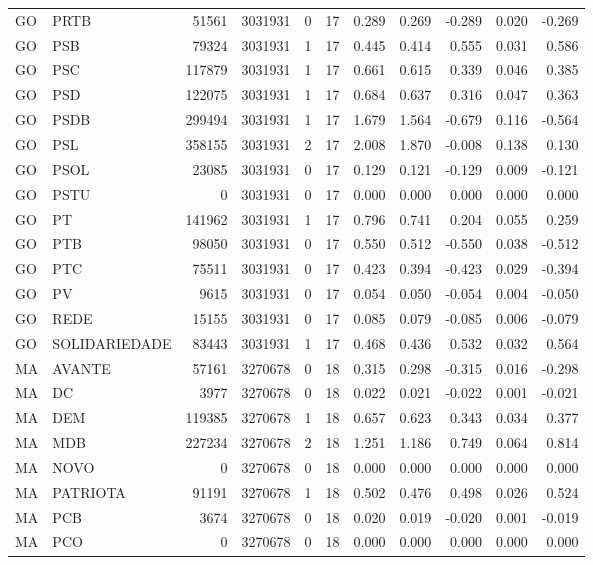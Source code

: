 \begin{landscape}
\begin{longtable}{llrrrrrrrrr}
GO & PRTB & 51561 & 3031931 & 0 & 17 & 0.289 & 0.269 & -0.289 & 0.020 & -0.269 \\
GO & PSB & 79324 & 3031931 & 1 & 17 & 0.445 & 0.414 & 0.555 & 0.031 & 0.586 \\
GO & PSC & 117879 & 3031931 & 1 & 17 & 0.661 & 0.615 & 0.339 & 0.046 & 0.385 \\
GO & PSD & 122075 & 3031931 & 1 & 17 & 0.684 & 0.637 & 0.316 & 0.047 & 0.363 \\
GO & PSDB & 299494 & 3031931 & 1 & 17 & 1.679 & 1.564 & -0.679 & 0.116 & -0.564 \\
GO & PSL & 358155 & 3031931 & 2 & 17 & 2.008 & 1.870 & -0.008 & 0.138 & 0.130 \\
GO & PSOL & 23085 & 3031931 & 0 & 17 & 0.129 & 0.121 & -0.129 & 0.009 & -0.121 \\
GO & PSTU & 0 & 3031931 & 0 & 17 & 0.000 & 0.000 & 0.000 & 0.000 & 0.000 \\
GO & PT & 141962 & 3031931 & 1 & 17 & 0.796 & 0.741 & 0.204 & 0.055 & 0.259 \\
GO & PTB & 98050 & 3031931 & 0 & 17 & 0.550 & 0.512 & -0.550 & 0.038 & -0.512 \\
GO & PTC & 75511 & 3031931 & 0 & 17 & 0.423 & 0.394 & -0.423 & 0.029 & -0.394 \\
GO & PV & 9615 & 3031931 & 0 & 17 & 0.054 & 0.050 & -0.054 & 0.004 & -0.050 \\
GO & REDE & 15155 & 3031931 & 0 & 17 & 0.085 & 0.079 & -0.085 & 0.006 & -0.079 \\
GO & SOLIDARIEDADE & 83443 & 3031931 & 1 & 17 & 0.468 & 0.436 & 0.532 & 0.032 & 0.564 \\
MA & AVANTE & 57161 & 3270678 & 0 & 18 & 0.315 & 0.298 & -0.315 & 0.016 & -0.298 \\
MA & DC & 3977 & 3270678 & 0 & 18 & 0.022 & 0.021 & -0.022 & 0.001 & -0.021 \\
MA & DEM & 119385 & 3270678 & 1 & 18 & 0.657 & 0.623 & 0.343 & 0.034 & 0.377 \\
MA & MDB & 227234 & 3270678 & 2 & 18 & 1.251 & 1.186 & 0.749 & 0.064 & 0.814 \\
MA & NOVO & 0 & 3270678 & 0 & 18 & 0.000 & 0.000 & 0.000 & 0.000 & 0.000 \\
MA & PATRIOTA & 91191 & 3270678 & 1 & 18 & 0.502 & 0.476 & 0.498 & 0.026 & 0.524 \\
MA & PCB & 3674 & 3270678 & 0 & 18 & 0.020 & 0.019 & -0.020 & 0.001 & -0.019 \\
MA & PCO & 0 & 3270678 & 0 & 18 & 0.000 & 0.000 & 0.000 & 0.000 & 0.000 \\

\end{longtable}
\end{landscape}
